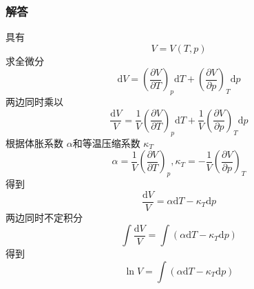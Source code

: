 \subsubsection{解答}
具有
\begin{equation}
    V=V\left( T,p \right) 
\end{equation}
求全微分
\begin{equation}
    \mathrm{d}V=\left( \frac{\partial V}{\partial T} \right) _p\mathrm{d}T+\left( \frac{\partial V}{\partial p} \right) _T\mathrm{d}p
\end{equation}
两边同时乘以
\begin{equation}
    \frac{\mathrm{d}V}{V}=\frac{1}{V}\left( \frac{\partial V}{\partial T} \right) _p\mathrm{d}T+\frac{1}{V}\left( \frac{\partial V}{\partial p} \right) _T\mathrm{d}p
\end{equation}
根据体胀系数 $\alpha$和等温压缩系数 $\kappa_T$
\begin{equation}
    \alpha =\frac{1}{V}\left( \frac{\partial V}{\partial T} \right) _p,\kappa _T=-\frac{1}{V}\left( \frac{\partial V}{\partial p} \right) _T
\end{equation}
得到
\begin{equation}
    \frac{\mathrm{d}V}{V}=\alpha \mathrm{d}T-\kappa _T\mathrm{d}p
\end{equation}
两边同时不定积分
\begin{equation}
    \int{\frac{\mathrm{d}V}{V}}=\int{\left( \alpha \mathrm{d}T-\kappa _T\mathrm{d}p \right)}
\end{equation}
得到
\begin{equation}
    \ln V=\int{\left( \alpha \mathrm{d}T-\kappa _T\mathrm{d}p \right)}
\end{equation}

